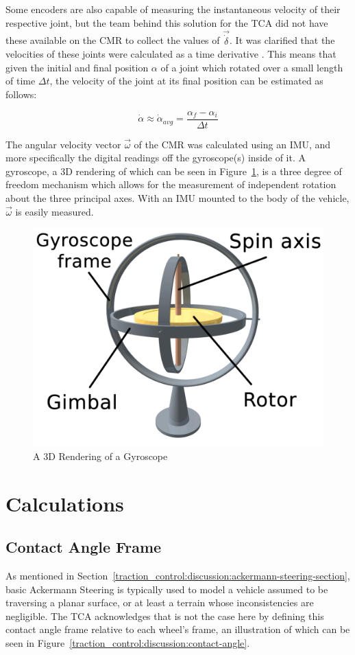 Some encoders are also capable of measuring the instantaneous velocity of their respective joint, but the team behind this solution for the \ac{TCA} did not have these available on the \ac{CMR} to collect the values of $\vec{\dot{\delta}}$. It was clarified that the velocities of these joints were calculated as a time derivative \cite{tractl}. This means that given the initial and final position $\alpha$ of a joint which rotated over a small length of time $\Delta t$, the velocity of the joint at its final position can be estimated as follows:

\begin{equation}
\dot{\alpha} \approx \dot{\alpha}_{avg} = \frac{\alpha_{f} - \alpha_{i}}{\Delta t}
\end{equation}

The angular velocity vector $\vec{\omega}$ of the \ac{CMR} was calculated using an \ac{IMU}, and more specifically the digital readings off the gyroscope(s) inside of it. A gyroscope, a 3D rendering of which can be seen in Figure~\ref{traction_control:discussion:gyro}, is a three degree of freedom mechanism which allows for the measurement of independent rotation about the three principal axes. With an \ac{IMU} mounted to the body of the vehicle, $\vec{\omega}$ is easily measured.

\begin{figure}[htbp]
	\centering
	\includegraphics[width=.5\textwidth]{sections/discussion/images/gyroscope.png}
	\caption{A 3D Rendering of a Gyroscope}
	\label{traction_control:discussion:gyro}
\end{figure}

\acresetall
\section{Calculations}
\subsection{Contact Angle Frame}\label{traction_control:discussion:contact-angle-section}
As mentioned in Section~\ref{traction_control:discussion:ackermann-steering-section}, basic Ackermann Steering is typically used to model a vehicle assumed to be traversing a planar surface, or at least a terrain whose inconsistencies are negligible. The \ac{TCA} acknowledges that is not the case here by defining this contact angle frame relative to each wheel's frame, an illustration of which can be seen in Figure~\ref{traction_control:discussion:contact-angle}.

